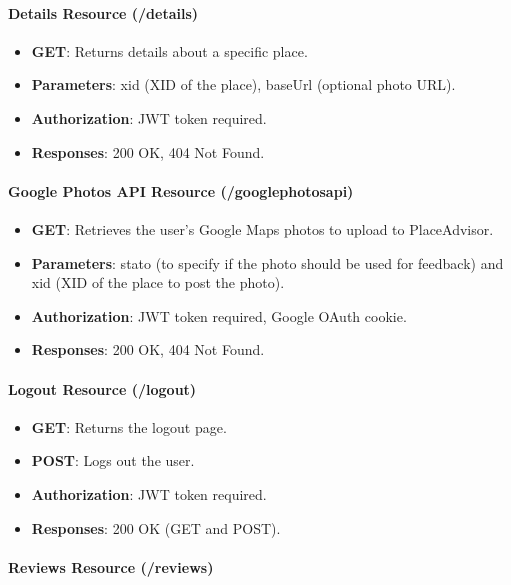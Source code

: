 \documentclass[../main.tex]{subfiles}
\begin{document}
\paragraph{Details Resource (/details)}

\begin{itemize}
  \item \textbf{GET}: Returns details about a specific place.
  \item \textbf{Parameters}: xid (XID of the place), baseUrl (optional photo URL).
  \item \textbf{Authorization}: JWT token required.
  \item \textbf{Responses}: 200 OK, 404 Not Found.
\end{itemize}

\paragraph{Google Photos API Resource (/googlephotosapi)}

\begin{itemize}
  \item \textbf{GET}: Retrieves the user's Google Maps photos to upload to PlaceAdvisor.
  \item \textbf{Parameters}: stato (to specify if the photo should be used for feedback) and xid (XID of the place to post the photo).
  \item \textbf{Authorization}: JWT token required, Google OAuth cookie.
  \item \textbf{Responses}: 200 OK, 404 Not Found.
\end{itemize}

\paragraph{Logout Resource (/logout)}

\begin{itemize}
  \item \textbf{GET}: Returns the logout page.
  \item \textbf{POST}: Logs out the user.
  \item \textbf{Authorization}: JWT token required.
  \item \textbf{Responses}: 200 OK (GET and POST).
\end{itemize}

\paragraph{Reviews Resource (/reviews)}
\end{document}

